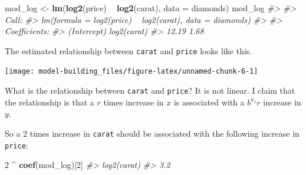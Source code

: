 \documentclass[]{book}
\newenvironment{Shaded}{\begin{snugshade}}{\end{snugshade}}
\newcommand{\CommentTok}[1]{\textcolor[rgb]{0.56,0.35,0.01}{\textit{#1}}}
\newcommand{\DataTypeTok}[1]{\textcolor[rgb]{0.13,0.29,0.53}{#1}}
\newcommand{\DecValTok}[1]{\textcolor[rgb]{0.00,0.00,0.81}{#1}}
\newcommand{\FloatTok}[1]{\textcolor[rgb]{0.00,0.00,0.81}{#1}}
\newcommand{\KeywordTok}[1]{\textcolor[rgb]{0.13,0.29,0.53}{\textbf{#1}}}
\newcommand{\NormalTok}[1]{#1}
\newcommand{\OperatorTok}[1]{\textcolor[rgb]{0.81,0.36,0.00}{\textbf{#1}}}
\newcommand{\StringTok}[1]{\textcolor[rgb]{0.31,0.60,0.02}{#1}}
\theoremstyle{plain}
\theoremstyle{remark}
\begin{document}
\begin{Shaded}
\begin{Highlighting}[]
\NormalTok{mod_log <-}\StringTok{ }\KeywordTok{lm}\NormalTok{(}\KeywordTok{log2}\NormalTok{(price) }\OperatorTok{~}\StringTok{ }\KeywordTok{log2}\NormalTok{(carat), }\DataTypeTok{data =}\NormalTok{ diamonds)}
\NormalTok{mod_log}
\CommentTok{#> }
\CommentTok{#> Call:}
\CommentTok{#> lm(formula = log2(price) ~ log2(carat), data = diamonds)}
\CommentTok{#> }
\CommentTok{#> Coefficients:}
\CommentTok{#> (Intercept)  log2(carat)  }
\CommentTok{#>       12.19         1.68}
\end{Highlighting}
\end{Shaded}

The estimated relationship between \texttt{carat} and \texttt{price} looks like this.

\begin{Shaded}
\end{Shaded}

\begin{center}\texttt{[image: model-building\_files/figure-latex/unnamed-chunk-6-1]} \end{center}

What is the relationship between \texttt{carat} and \texttt{price}? It is not linear.
I claim that the relationship is that a \(r\) times increase in \(x\) is associated
with a \(b^{a_1} r\) increase in \(y\).

So a 2 times increase in \texttt{carat} should be associated with the following increase
in \texttt{price}:

\begin{Shaded}
\begin{Highlighting}[]
\DecValTok{2} \OperatorTok{^}\StringTok{ }\KeywordTok{coef}\NormalTok{(mod_log)[}\DecValTok{2}\NormalTok{]}
\CommentTok{#> log2(carat) }
\CommentTok{#>         3.2}
\end{Highlighting}
\end{Shaded}
\end{document}
